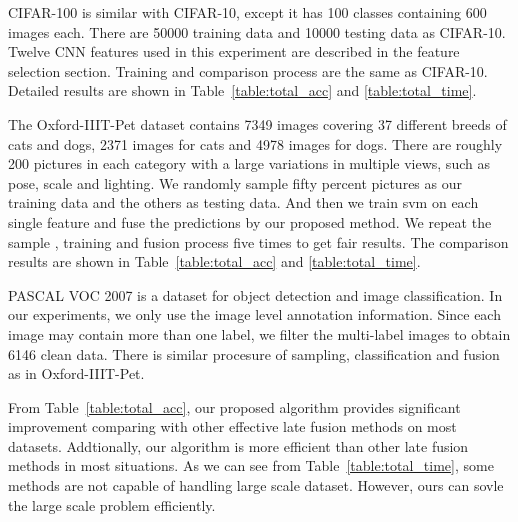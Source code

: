 \documentclass[10pt,twocolumn,letterpaper]{article}
\begin{document}

CIFAR-100 is similar with CIFAR-10, except it has 100 classes containing 600 images each.
There are 50000 training data and 10000 testing data as CIFAR-10.
Twelve CNN features used in this experiment are described in the feature selection section.
Training and comparison process are the same as CIFAR-10.
Detailed results are shown in Table~\ref{table:total_acc} and \ref{table:total_time}.



The Oxford-IIIT-Pet dataset contains 7349 images covering 37 different breeds of cats and dogs, 2371 images for cats and 4978 images for dogs.
There are roughly 200 pictures in each category with a large variations in multiple views, such as pose, scale and lighting.
We randomly sample fifty percent pictures as our training data and the others as testing data.
And then we train svm on each single feature and fuse the predictions by our proposed method.
We repeat the sample , training and fusion process five times to get fair results.
The comparison results are shown in Table~\ref{table:total_acc} and \ref{table:total_time}.

PASCAL VOC 2007 is a dataset for object detection and image classification.
In our experiments, we only use the image level annotation information.
Since each image may contain more than one label, we filter the multi-label images to obtain 6146 clean data.
There is similar procesure of sampling, classification and fusion as in Oxford-IIIT-Pet.

From Table~\ref{table:total_acc}, our proposed algorithm provides significant improvement comparing with other effective late fusion methods on most datasets.
Addtionally, our algorithm is more efficient than other late fusion methods in most situations.
As we can see from Table~\ref{table:total_time}, some methods are not capable of handling large scale dataset.
However, ours can sovle the large scale problem efficiently.
\end{document}
